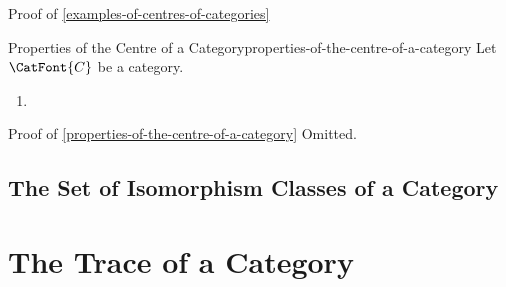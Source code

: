 \begin{Proof}{Proof of \cref{examples-of-centres-of-categories}}%

\end{Proof}
\begin{proposition}{Properties of the Centre of a Category}{properties-of-the-centre-of-a-category}%
    Let $\CatFont{C}$ be a category.
    \begin{enumerate}
        \item\label{properties-of-the-centre-of-a-category-interaction-with-monoidal-categories}
    \end{enumerate}
\end{proposition}
\begin{Proof}{Proof of \cref{properties-of-the-centre-of-a-category}}%
    Omitted.
\end{Proof}
\subsection{The Set of Isomorphism Classes of a Category}\label{subsection-the-set-of-isomorphism-classes-of-a-category}
\section{The Trace of a Category}\label{section-the-trace-of-a-category}
